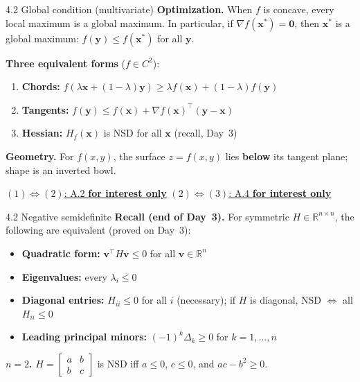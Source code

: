 \documentclass[11pt,aspectratio=169]{beamer}
\newcommand{\InterestOnly}{\textcolor{mAccent}{\textbf{for interest only}}}
\begin{document}
\begin{frame}{4.2 Global condition (multivariate)}
  \small
  \textbf{Optimization.} When $f$ is concave, every local maximum is a global maximum. In particular, if $\nabla f(\mathbf{x}^*)=\mathbf{0}$, then $\mathbf{x}^*$ is a global maximum: $f(\mathbf{y}) \leq f(\mathbf{x}^*)$ for all $\mathbf{y}$.
  
  \textbf{Three equivalent forms} ($f \in C^2$):
  \begin{enumerate}
    \item \textbf{Chords:} $f(\lambda \mathbf{x}+(1-\lambda)\mathbf{y}) \geq \lambda f(\mathbf{x})+(1-\lambda)f(\mathbf{y})$
    
    \item \textbf{Tangents:} $f(\mathbf{y}) \leq f(\mathbf{x})+\nabla f(\mathbf{x})^\top(\mathbf{y}-\mathbf{x})$
    
    \item \textbf{Hessian:} $H_f(\mathbf{x})$ is NSD for all $\mathbf{x}$ (recall, Day~3)
  \end{enumerate}
  
  \textbf{Geometry.} For $f(x,y)$, the surface $z=f(x,y)$ lies \textbf{below} its tangent plane; shape is an inverted bowl.
  
  \hfill\hyperlink{appendix:concave_12}{\scriptsize $(1)\Leftrightarrow(2)$: A.2 \InterestOnly}\quad
  \hyperlink{appendix:multivariate_concave}{\scriptsize $(2)\Leftrightarrow(3)$: A.4 \InterestOnly}
\end{frame}

\begin{frame}{4.2 Negative semidefinite}
  \small
  \textbf{Recall (end of Day~3).} For symmetric $H \in \mathbb{R}^{n \times n}$, the following are equivalent (proved on Day~3):
  
  \begin{itemize}
    \item \textbf{Quadratic form:} $\mathbf{v}^\top H \mathbf{v} \leq 0$ for all $\mathbf{v} \in \mathbb{R}^n$
    
    \item \textbf{Eigenvalues:} every $\lambda_i \leq 0$
    
    \item \textbf{Diagonal entries:} $H_{ii} \leq 0$ for all $i$ (necessary); if $H$ is diagonal, NSD $\Leftrightarrow$ all $H_{ii} \leq 0$
    
    \item \textbf{Leading principal minors:} $(-1)^k \Delta_k \geq 0$ for $k=1,\ldots,n$
  \end{itemize}
  
  \textbf{$n=2$.} $H = \begin{bmatrix} a & b \\ b & c \end{bmatrix}$ is NSD iff $a \leq 0$, $c \leq 0$, and $ac - b^2 \geq 0$.
\end{frame}
\end{document}
